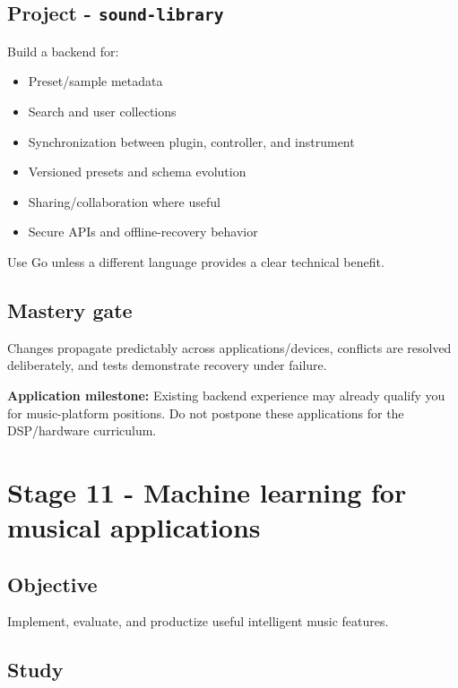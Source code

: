 \documentclass[11pt,letterpaper]{article}
\begin{document}
\subsection*{Project - \texttt{sound-library}}\label{project-sound-library}

Build a backend for:

\begin{itemize}
\item Preset/sample metadata
\item Search and user collections
\item Synchronization between plugin, controller, and instrument
\item Versioned presets and schema evolution
\item Sharing/collaboration where useful
\item Secure APIs and offline-recovery behavior
\end{itemize}

Use Go unless a different language provides a clear technical benefit.

\subsection*{Mastery gate}\label{mastery-gate-10}

Changes propagate predictably across applications/devices, conflicts are resolved deliberately, and tests demonstrate recovery under failure.

\textbf{Application milestone:} Existing backend experience may already qualify you for music-platform positions. Do not postpone these applications for the DSP/hardware curriculum.

\clearpage

\section{Stage 11 - Machine learning for musical applications}\label{stage-11-machine-learning-for-musical-applications}

\subsection*{Objective}\label{objective-11}

Implement, evaluate, and productize useful intelligent music features.

\subsection*{Study}\label{study-8}
\end{document}
